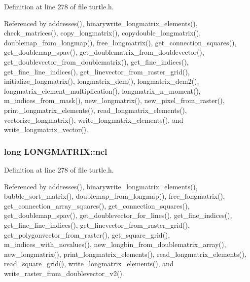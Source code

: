Definition at line 278 of file turtle.\-h.



Referenced by addresses(), binarywrite\-\_\-longmatrix\-\_\-elements(), check\-\_\-matrices(), copy\-\_\-longmatrix(), copydouble\-\_\-longmatrix(), doublemap\-\_\-from\-\_\-longmap(), free\-\_\-longmatrix(), get\-\_\-connection\-\_\-squares(), get\-\_\-doublemap\-\_\-spav(), get\-\_\-doublematrix\-\_\-from\-\_\-doublevector(), get\-\_\-doublevector\-\_\-from\-\_\-doublematrix(), get\-\_\-fine\-\_\-indices(), get\-\_\-fine\-\_\-line\-\_\-indices(), get\-\_\-linevector\-\_\-from\-\_\-raster\-\_\-grid(), initialize\-\_\-longmatrix(), longmatrix\-\_\-dem(), longmatrix\-\_\-dem2(), longmatrix\-\_\-element\-\_\-multiplication(), longmatrix\-\_\-n\-\_\-moment(), m\-\_\-indices\-\_\-from\-\_\-mask(), new\-\_\-longmatrix(), new\-\_\-pixel\-\_\-from\-\_\-raster(), print\-\_\-longmatrix\-\_\-elements(), read\-\_\-longmatrix\-\_\-elements(), vectorize\-\_\-longmatrix(), write\-\_\-longmatrix\-\_\-elements(), and write\-\_\-longmatrix\-\_\-vector().

\hypertarget{struct_l_o_n_g_m_a_t_r_i_x_aaf64ac07b9a44811dd7f0e4ce148c79d}{
\subsubsection[{ncl}]{\setlength{\rightskip}{0pt plus 5cm}long L\-O\-N\-G\-M\-A\-T\-R\-I\-X\-::ncl}}\label{struct_l_o_n_g_m_a_t_r_i_x_aaf64ac07b9a44811dd7f0e4ce148c79d}


Definition at line 278 of file turtle.\-h.



Referenced by addresses(), binarywrite\-\_\-longmatrix\-\_\-elements(), bubble\-\_\-sort\-\_\-matrix(), doublemap\-\_\-from\-\_\-longmap(), free\-\_\-longmatrix(), get\-\_\-connection\-\_\-array\-\_\-squares(), get\-\_\-connection\-\_\-squares(), get\-\_\-doublemap\-\_\-spav(), get\-\_\-doublevector\-\_\-for\-\_\-lines(), get\-\_\-fine\-\_\-indices(), get\-\_\-fine\-\_\-line\-\_\-indices(), get\-\_\-linevector\-\_\-from\-\_\-raster\-\_\-grid(), get\-\_\-polygonvector\-\_\-from\-\_\-raster(), get\-\_\-square\-\_\-grid(), m\-\_\-indices\-\_\-with\-\_\-novalues(), new\-\_\-longbin\-\_\-from\-\_\-doublematrix\-\_\-array(), new\-\_\-longmatrix(), print\-\_\-longmatrix\-\_\-elements(), read\-\_\-longmatrix\-\_\-elements(), read\-\_\-square\-\_\-grid(), write\-\_\-longmatrix\-\_\-elements(), and write\-\_\-raster\-\_\-from\-\_\-doublevector\-\_\-v2().


